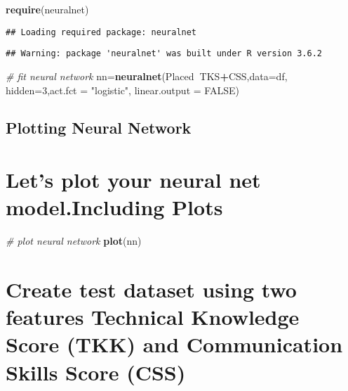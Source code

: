 \documentclass[
]{article}
\newenvironment{Shaded}{\begin{snugshade}}{\end{snugshade}}
\newcommand{\CommentTok}[1]{\textcolor[rgb]{0.56,0.35,0.01}{\textit{#1}}}
\newcommand{\DataTypeTok}[1]{\textcolor[rgb]{0.13,0.29,0.53}{#1}}
\newcommand{\DecValTok}[1]{\textcolor[rgb]{0.00,0.00,0.81}{#1}}
\newcommand{\KeywordTok}[1]{\textcolor[rgb]{0.13,0.29,0.53}{\textbf{#1}}}
\newcommand{\NormalTok}[1]{#1}
\newcommand{\OperatorTok}[1]{\textcolor[rgb]{0.81,0.36,0.00}{\textbf{#1}}}
\newcommand{\OtherTok}[1]{\textcolor[rgb]{0.56,0.35,0.01}{#1}}
\newcommand{\StringTok}[1]{\textcolor[rgb]{0.31,0.60,0.02}{#1}}
\begin{document}
\begin{Shaded}
\begin{Highlighting}[]
\KeywordTok{require}\NormalTok{(neuralnet)}
\end{Highlighting}
\end{Shaded}

\begin{verbatim}
## Loading required package: neuralnet
\end{verbatim}

\begin{verbatim}
## Warning: package 'neuralnet' was built under R version 3.6.2
\end{verbatim}

\begin{Shaded}
\begin{Highlighting}[]
\CommentTok{# fit neural network}
\NormalTok{nn=}\KeywordTok{neuralnet}\NormalTok{(Placed}\OperatorTok{~}\NormalTok{TKS}\OperatorTok{+}\NormalTok{CSS,}\DataTypeTok{data=}\NormalTok{df, }\DataTypeTok{hidden=}\DecValTok{3}\NormalTok{,}\DataTypeTok{act.fct =} \StringTok{"logistic"}\NormalTok{,}
                \DataTypeTok{linear.output =} \OtherTok{FALSE}\NormalTok{)}
\end{Highlighting}
\end{Shaded}

\hypertarget{plotting-neural-network}{%
\subsection{Plotting Neural Network}\label{plotting-neural-network}}

\hypertarget{lets-plot-your-neural-net-model.including-plots}{%
\section{Let's plot your neural net model.Including
Plots}\label{lets-plot-your-neural-net-model.including-plots}}

\begin{Shaded}
\begin{Highlighting}[]
\CommentTok{# plot neural network}
\KeywordTok{plot}\NormalTok{(nn)}
\end{Highlighting}
\end{Shaded}

\hypertarget{create-test-dataset-using-two-features-technical-knowledge-score-tkk-and-communication-skills-score-css}{%
\section{Create test dataset using two features Technical Knowledge
Score (TKK) and Communication Skills Score
(CSS)}\label{create-test-dataset-using-two-features-technical-knowledge-score-tkk-and-communication-skills-score-css}}
\end{document}
